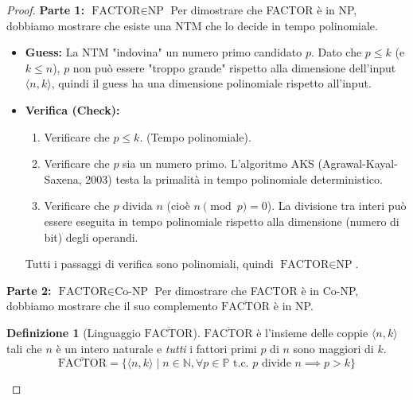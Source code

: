 \documentclass[a4paper]{article}
\theoremstyle{definition} %
\newtheorem{definition}{Definizione}
\begin{document}
\begin{proof}
\textbf{Parte 1: $\text{FACTOR} \in \text{NP}$}
Per dimostrare che FACTOR è in NP, dobbiamo mostrare che esiste una NTM che lo decide in tempo polinomiale.
\begin{itemize}
    \item \textbf{Guess:} La NTM "indovina" un numero primo candidato $p$. Dato che $p \le k$ (e $k \le n$), $p$ non può essere "troppo grande" rispetto alla dimensione dell'input $\langle n, k \rangle$, quindi il guess ha una dimensione polinomiale rispetto all'input.
    \item \textbf{Verifica (Check):}
    \begin{enumerate}
        \item Verificare che $p \le k$. (Tempo polinomiale).
        \item Verificare che $p$ sia un numero primo. L'algoritmo AKS (Agrawal-Kayal-Saxena, 2003) testa la primalità in tempo polinomiale deterministico.
        \item Verificare che $p$ divida $n$ (cioè $n \pmod p = 0$). La divisione tra interi può essere eseguita in tempo polinomiale rispetto alla dimensione (numero di bit) degli operandi.
    \end{enumerate}
    Tutti i passaggi di verifica sono polinomiali, quindi $\text{FACTOR} \in \text{NP}$.
\end{itemize}

\textbf{Parte 2: $\text{FACTOR} \in \text{Co-NP}$}
Per dimostrare che FACTOR è in Co-NP, dobbiamo mostrare che il suo complemento $\overline{\text{FACTOR}}$ è in NP.

\begin{definition}[Linguaggio $\overline{\text{FACTOR}}$]
$\overline{\text{FACTOR}}$ è l'insieme delle coppie $\langle n, k \rangle$ tali che $n$ è un intero naturale e \textit{tutti} i fattori primi $p$ di $n$ sono maggiori di $k$.
\[
\overline{\text{FACTOR}} = \{ \langle n, k \rangle \mid n \in \mathbb{N}, \forall p \in \mathbb{P} \text{ t.c. } p \text{ divide } n \implies p > k \}
\]
\end{definition}


\end{proof}
\end{document}
